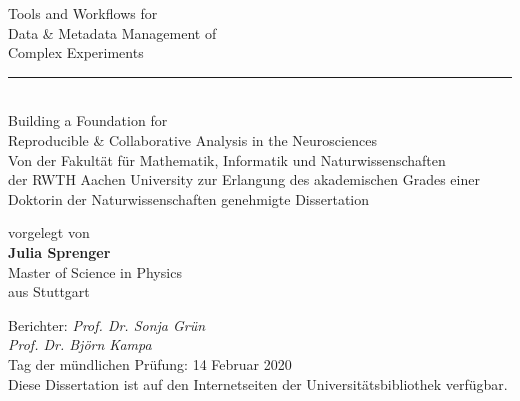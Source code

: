 \documentclass[
    pdftex,
    fontsize=11pt,
    a4paper
   ]{scrbook}
\renewcommand{\title}{\LARGE Tools and Workflows for\\\LARGE Data \& Metadata Management of\\\LARGE Complex Experiments}
\renewcommand{\subtitle}{Building a Foundation for \\Reproducible \& Collaborative Analysis in the Neurosciences}
\newcommand{\thesisdate}{14 Februar 2020}
\newcommand{\thesisauthor}{Julia Sprenger}
\newcommand{\authorbirthplace}{Stuttgart}
\newcommand{\authordegree}{Master of Science in Physics}
\begin{document}
\begin{titlepage}
    \begin{center}
        \Large
        \title\\
        \vspace{1cm}
        \textcolor{black!50}{\rule{3cm}{0.4pt}}\\
        \vspace{1cm}
        \Large\subtitle\\
        \vspace{3cm}
        \large
        Von der Fakultät für Mathematik, Informatik und Naturwissenschaften\\
        der RWTH Aachen University zur Erlangung des akademischen Grades einer
        Doktorin der Naturwissenschaften genehmigte Dissertation
        
        \vspace{1.5cm}
        vorgelegt von\\
        \large{\textbf{\thesisauthor{}}}\\
        \normalsize
        \authordegree\\
        \vspace{0.5cm}
        aus \authorbirthplace\\
        \vspace{1cm}
        \large
    \end{center}
    Berichter: \textit{Prof. Dr. Sonja Grün}\\
    \hphantom{Berichter: }\textit{Prof. Dr. Björn Kampa}\\
    
    \noindent
    Tag der mündlichen Prüfung: \thesisdate\\
    
    \noindent
    Diese Dissertation ist auf den Internetseiten der Universitätsbibliothek verfügbar.
\end{titlepage}
\end{document}
